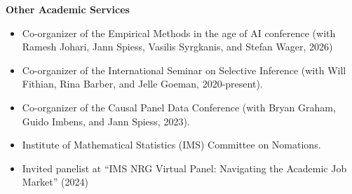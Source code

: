 \documentclass{article}
\begin{document}

\vspace{7mm}
\begin{large}
\noindent \textbf{Other Academic Services}
\end{large}

\begin{itemize}
\item Co-organizer of the Empirical Methods in the age of AI conference (with Ramesh Johari, Jann Spiess, Vasilis Syrgkanis, and Stefan Wager, 2026)
\item Co-organizer of the International Seminar on Selective Inference (with Will Fithian, Rina Barber, and Jelle Goeman, 2020-present).
\item Co-organizer of the Causal Panel Data Conference (with Bryan Graham, Guido Imbens, and Jann Spiess, 2023).
\item Institute of Mathematical Statistics (IMS) Committee on Nomations. 
\item Invited panelist at ``IMS NRG Virtual Panel: Navigating the Academic Job Market'' (2024)
\end{itemize}
\end{document}
